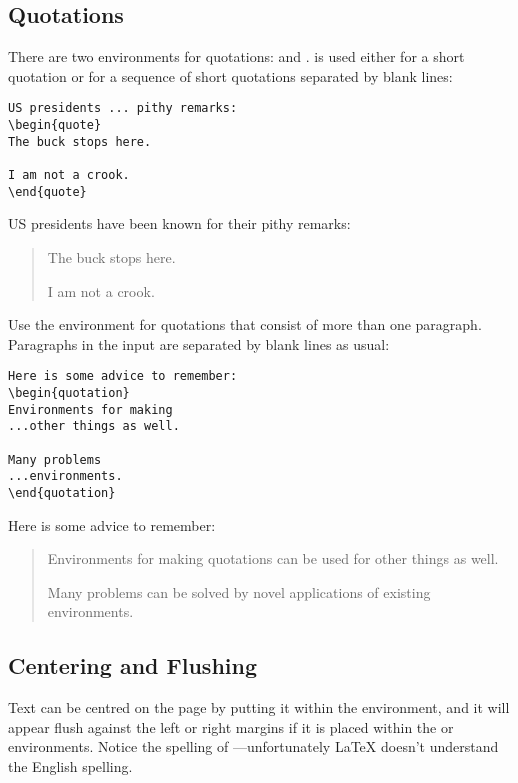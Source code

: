 \subsection{Quotations}

There are two environments for quotations:  and .
 is used either for a short quotation or for a sequence of
short quotations separated by blank lines:

\egstart
\begin{verbatim}
US presidents ... pithy remarks:
\begin{quote}
The buck stops here.

I am not a crook.
\end{quote}
\end{verbatim}
\egmid%
US presidents have been known for their pithy remarks:
\begin{quote}
The buck stops here.

I am not a crook.
\end{quote}
\egend

Use the  environment for quotations that consist of more
than one paragraph.  Paragraphs in the input are separated by blank
lines as usual:
\egstart
\begin{verbatim}
Here is some advice to remember:
\begin{quotation}
Environments for making
...other things as well.

Many problems
...environments.
\end{quotation}
\end{verbatim}
\egmid%
Here is some advice to remember:
\begin{quotation}
Environments for making quotations
can be used for other things as well.

Many problems can be solved by
novel applications of existing
environments.
\end{quotation}
\egend

\subsection{Centering and Flushing}

Text can be centred on the page by putting it within the 
environment, and it will appear flush against the left or right margins if it
is placed within the  or  environments.
Notice the
spelling of ---unfortunately \LaTeX{} doesn't understand the English
spelling.


